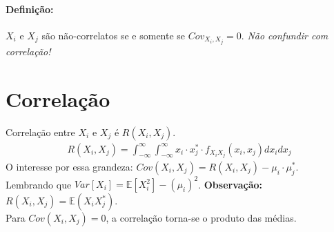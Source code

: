 \documentclass{article}
\begin{document}
\paragraph*{Definição:}
$X_i$ e $X_j$ são não-correlatos se e somente se $Cov_{X_i,X_j} = 0$. \textit{Não confundir com
correlação!}

\section{Correlação}
Correlação entre $X_i$ e $X_j$ é $R(X_i,X_j)$.
\begin{align*}
    R(X_i,X_j) = \int^{\infty}_{-\infty} \int^{\infty}_{-\infty} x_i \cdot x_j^* \cdot f_{X_i X_j}(x_i,x_j) dx_i dx_j
\end{align*}
O interesse por essa grandeza: $Cov(X_i,X_j) = R(X_i,X_j) - \mu_i \cdot \mu_j^*$.
\\
Lembrando que $Var[X_i] = \mathbb{E}[X_i^2] - (\mu_i)^2$. \textbf{Observação:} $R(X_i,X_j) =
\mathbb{E}(X_iX_j^*)$.
\\
Para $Cov(X_i,X_j) = 0$, a correlação torna-se o produto das
médias.
\end{document}
